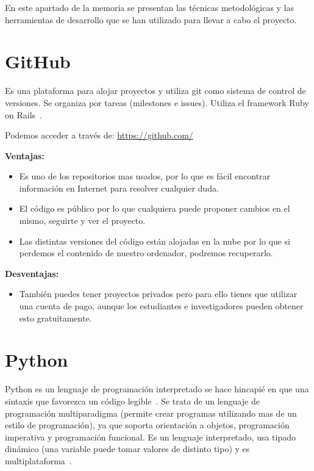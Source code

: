 
En este apartado de la memoria se presentan las técnicas metodológicas y las herramientas de desarrollo que se han utilizado para llevar a cabo el proyecto. 

\section{GitHub}
Es una plataforma para alojar proyectos y utiliza git como sistema de control de versiones. Se organiza por tareas (milestones e issues).
Utiliza el framework Ruby on Rails~\cite{github}.

Podemos acceder a través de: \url{https://github.com/}

\textbf{Ventajas:}

\begin{itemize}
\item Es uno de los repositorios mas usados, por lo que es fácil encontrar información en Internet para resolver cualquier duda.

\item El código es público por lo que cualquiera puede proponer cambios en el mismo, seguirte y ver el proyecto.

\item Las distintas versiones del código están alojadas en la nube por lo que si perdemos el contenido de nuestro ordenador, podremos recuperarlo.
\end{itemize}

\textbf{Desventajas:}

\begin{itemize}
\item También puedes tener proyectos privados pero para ello tienes que utilizar una cuenta de pago, aunque los estudiantes e investigadores pueden obtener esto gratuitamente.
\end{itemize}

\section{Python}
Python es un lenguaje de programación interpretado se hace hincapié en que una sintaxis que favorezca un código legible~\cite{python}.
Se trata de un lenguaje de programación multiparadigma (permite crear programas utilizando mas de un estilo de programación), ya que soporta orientación a objetos, programación imperativa y programación funcional. Es un lenguaje interpretado, usa tipado dinámico (una variable puede tomar valores de distinto tipo) y es multiplataforma~\cite{wiki:python}.

